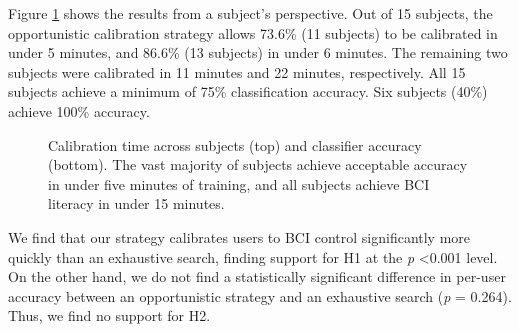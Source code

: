 Figure \ref{fig:calibration_results} shows the results from a subject's perspective. Out of 15 subjects, the opportunistic calibration strategy allows 73.6\% (11 subjects) to be calibrated in under 5 minutes, and 86.6\% (13 subjects) in under 6 minutes. The remaining two subjects were calibrated in 11 minutes and 22 minutes, respectively. All 15 subjects achieve a minimum of 75\% classification accuracy. Six subjects (40\%) achieve 100\% accuracy.

\begin{figure}[!h]
  \vspace{-0.2cm}
  \centering
   {}
  \caption{Calibration time across subjects (top) and classifier accuracy (bottom). The vast majority of subjects achieve acceptable accuracy in under five minutes of training, and all subjects achieve BCI literacy in under 15 minutes. }
  \label{fig:calibration_results}
  \vspace{-0.1cm}
\end{figure}

We find that our strategy calibrates users to BCI control significantly more quickly than an exhaustive search, finding support for H1 at the \textit{p} \textless 0.001 level. On the other hand, we do not find a statistically significant difference in per-user accuracy between an opportunistic strategy and an exhaustive search (\textit{p} = 0.264). Thus, we find no support for H2.

